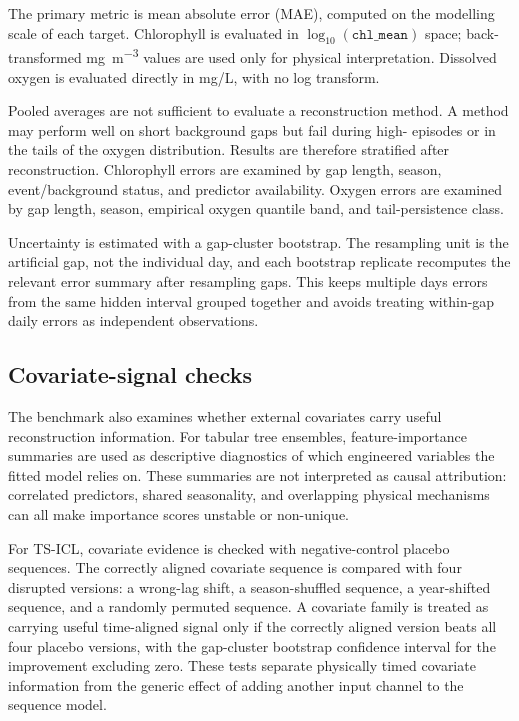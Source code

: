 The primary metric is mean absolute error (MAE), computed on the modelling scale of each target.
Chlorophyll is evaluated in $\log_{10}(\texttt{chl\_mean})$ space; back-transformed
mg~m\textsuperscript{$-3$} values are used only for physical interpretation. Dissolved oxygen is
evaluated directly in mg/L, with no log transform.

Pooled averages are not sufficient to evaluate a reconstruction method. A method may perform well
on short background gaps but fail during high-\chl{} episodes or in the tails of the oxygen
distribution. Results are therefore stratified after reconstruction. Chlorophyll errors are
examined by gap length, season, event/background status, and predictor availability. Oxygen
errors are examined by gap length, season, empirical oxygen quantile band, and tail-persistence
class. 

Uncertainty is estimated with a gap-cluster bootstrap. The resampling unit is the artificial gap,
not the individual day, and each bootstrap replicate recomputes the relevant error summary after
resampling gaps. This keeps multiple days errors from the same hidden interval grouped together and
avoids treating within-gap daily errors as independent observations.

\subsection{Covariate-signal checks}
\label{sec:covariate_signal}

The benchmark also examines whether external covariates carry useful reconstruction information.
For tabular tree ensembles, feature-importance summaries are used as descriptive diagnostics of
which engineered variables the fitted model relies on. These summaries are not interpreted as
causal attribution: correlated predictors, shared seasonality, and overlapping physical
mechanisms can all make importance scores unstable or non-unique.

For TS-ICL, covariate evidence is checked with negative-control placebo sequences. The correctly
aligned covariate sequence is compared with four disrupted versions: a wrong-lag shift, a
season-shuffled sequence, a year-shifted sequence, and a randomly permuted sequence. A covariate
family is treated as carrying useful time-aligned signal only if the correctly aligned version
beats all four placebo versions, with the gap-cluster bootstrap confidence interval for the
improvement excluding zero. These tests separate physically timed covariate information from the
generic effect of adding another input channel to the sequence model.